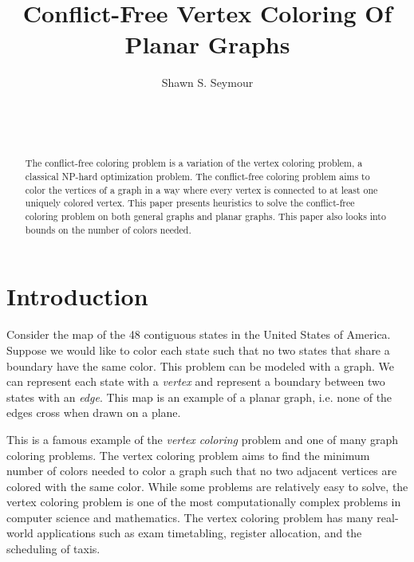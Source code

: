 \documentclass{sig-alternate}
\begin{document}

\title{Conflict-Free Vertex Coloring Of Planar Graphs}


\author{
\alignauthor
Shawn S. Seymour\\
	\\
	\\
	\\
}

\maketitle
\begin{abstract}
The conflict-free coloring problem is a variation of the vertex coloring problem, a classical NP-hard optimization problem. The conflict-free coloring problem aims to color the vertices of a graph in a way where every vertex is connected to at least one uniquely colored vertex. This paper presents heuristics to solve the conflict-free coloring problem on both general graphs and planar graphs. This paper also looks into bounds on the number of colors needed.
\end{abstract}

\section{Introduction}
\label{sec:introduction}

Consider the map of the 48 contiguous states in the United States of America. Suppose we would like to color each state such that no two states that share a boundary have the same color. This problem can be modeled with a graph. We can represent each state with a \emph{vertex} and represent a boundary between two states with an \emph{edge}. This map is an example of a planar graph, i.e. none of the edges cross when drawn on a plane.

This is a famous example of the \emph{vertex coloring} problem and one of many graph coloring problems. The vertex coloring problem aims to find the minimum number of colors needed to color a graph such that no two adjacent vertices are colored with the same color. While some problems are relatively easy to solve, the vertex coloring problem is one of the most computationally complex problems in computer science and mathematics. The vertex coloring problem has many real-world applications such as exam timetabling, register allocation, and the scheduling of taxis.
\end{document}
